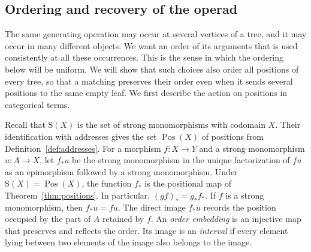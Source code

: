 \documentclass[11pt,a4paper]{article}
\theoremstyle{plain}
\theoremstyle{definition}
\theoremstyle{remark}
\newcommand{\Occ}{\mathrm{S}}
\newcommand{\Pos}{\operatorname{Pos}}
\begin{document}
\subsection{Ordering and recovery of the operad}\label{sec:ordering}
The same generating operation may occur at several vertices of a
tree, and it may occur in many different objects. We want an order
of its arguments that is used consistently at all these occurrences.
This is the sense in which the ordering below will be uniform.
We will show that such choices also order all positions of every
tree, so that a matching preserves their order even when it sends
several positions to the same empty leaf. We first describe the
action on positions in categorical terms.

Recall that $\Occ(X)$ is the set of strong monomorphisms with
codomain $X$. Their identification with addresses gives the set
$\Pos(X)$ of positions from Definition~\ref{def:addresses}.
\label{not:occurrence-images}
For a morphism $f:X\to Y$ and a strong monomorphism $u:A\to X$,
let $f_*u$ be the strong monomorphism in the unique factorization
of $fu$ as an epimorphism followed by a strong monomorphism.
Under $\Occ(X)=\Pos(X)$, the function $f_*$ is the positional
map of Theorem~\ref{thm:positions}. In particular, $(gf)_*=g_*f_*$.
If $f$ is a strong monomorphism, then $f_*u=fu$.
The direct image $f_*u$ records the position occupied by the part
of $A$ retained by $f$.
An \emph{order embedding} is an injective map that preserves and
reflects the order. Its image is an \emph{interval} if every element
lying between two elements of the image also belongs to the image.
\end{document}
